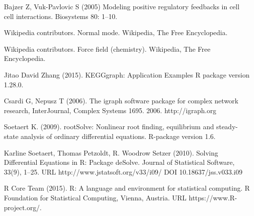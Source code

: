 
\begin{thebibliography}{00}

 Bajzer Z, Vuk-Pavlovic S (2005)  
\newblock Modeling positive regulatory feedbacks in cell cell interactions. 
\newblock Biosystems 80: 1–10. 

Wikipedia contributors. 
\newblock Normal mode.
\newblock Wikipedia, The Free Encyclopedia.

Wikipedia contributors. 
\newblock Force field (chemistry).
\newblock Wikipedia, The Free Encyclopedia.

 Jitao David Zhang (2015). 
\newblock KEGGgraph: Application Examples
\newblock R package version 1.28.0.

Csardi G, Nepusz T (2006).
\newblock The igraph software package for complex network research,
\newblock  InterJournal, Complex Systems 1695. 2006. http://igraph.org

Soetaert K. (2009).  
\newblock rootSolve: Nonlinear root finding, equilibrium and steady-state analysis of ordinary differential equations.  
\newblock R-package version 1.6.

Karline Soetaert, Thomas Petzoldt, R. Woodrow Setzer (2010). 
\newblock Solving Differential Equations in R: Package deSolve. 
\newblock Journal of Statistical Software, 33(9), 1--25. URL http://www.jstatsoft.org/v33/i09/ DOI 10.18637/jss.v033.i09
 
R Core Team (2015). 
\newblock R: A language and environment for statistical computing. R Foundation for Statistical Computing, Vienna, Austria.
\newblock URL https://www.R-project.org/.

\end{thebibliography}

